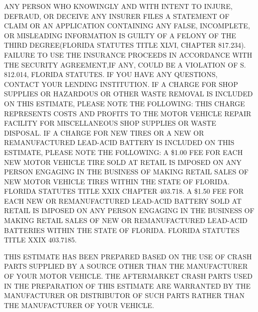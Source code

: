 \documentclass[letterpaper,10pt]{article}
\newcommand{\legal}{\fontsize{10}{13.3}\selectfont}      %
\begin{document}
\newpage
\legal\raggedright{}
\vspace*{-17pt}
ANY PERSON WHO KNOWINGLY AND WITH INTENT TO INJURE, DEFRAUD, OR DECEIVE ANY INSURER FILES A STATEMENT OF CLAIM OR AN APPLICATION CONTAINING ANY FALSE, INCOMPLETE, OR MISLEADING INFORMATION IS GUILTY OF A FELONY OF THE THIRD DEGREE(FLORIDA STATUTES TITLE XLVI, CHAPTER 817.234). FAILURE TO USE THE INSURANCE PROCEEDS IN ACCORDANCE WITH THE SECURITY AGREEMENT,IF ANY, COULD BE A VIOLATION OF S. 812.014, FLORIDA STATUTES. IF YOU HAVE ANY QUESTIONS, CONTACT YOUR LENDING INSTITUTION. IF A CHARGE FOR SHOP SUPPLIES OR HAZARDOUS OR OTHER WASTE REMOVAL IS INCLUDED ON THIS ESTIMATE, PLEASE NOTE THE FOLLOWING: \textquotedbl THIS CHARGE REPRESENTS COSTS AND PROFITS TO THE MOTOR VEHICLE REPAIR FACILITY FOR MISCELLANEOUS SHOP SUPPLIES OR WASTE DISPOSAL.\textquotedbl{} IF A CHARGE FOR NEW TIRES OR A NEW OR REMANUFACTURED LEAD-ACID BATTERY IS INCLUDED ON THIS ESTIMATE, PLEASE NOTE THE FOLLOWING: A \$1.00 FEE FOR EACH NEW MOTOR VEHICLE TIRE SOLD AT RETAIL IS IMPOSED ON ANY PERSON ENGAGING IN THE BUSINESS OF MAKING RETAIL SALES OF NEW MOTOR VEHICLE TIRES WITHIN THE STATE OF FLORIDA. FLORIDA STATUTES TITLE XXIX CHAPTER 403.718. A \$1.50 FEE FOR EACH NEW OR REMANUFACTURED LEAD-ACID BATTERY SOLD AT RETAIL IS IMPOSED ON ANY PERSON ENGAGING IN THE BUSINESS OF MAKING RETAIL SALES OF NEW OR REMANUFACTURED LEAD-ACID BATTERIES WITHIN THE STATE OF FLORIDA. FLORIDA STATUTES TITLE XXIX 403.7185.

\vspace{13.3pt}
THIS ESTIMATE HAS BEEN PREPARED BASED ON THE USE OF CRASH PARTS SUPPLIED BY A SOURCE OTHER THAN THE MANUFACTURER OF YOUR MOTOR VEHICLE. THE AFTERMARKET CRASH PARTS USED IN THE PREPARATION OF THIS ESTIMATE ARE WARRANTED BY THE MANUFACTURER OR DISTRIBUTOR OF SUCH PARTS RATHER THAN THE MANUFACTURER OF YOUR VEHICLE.
\end{document}

